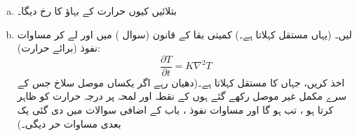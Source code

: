 \begin{enumerate}[a.]
\item
بتلائیں  کیوں حرارت کے بہاؤ کا رخ دیگا۔
\item
{}  لیں۔ (یہاں مستقل  کہلاتا ہے۔) کمیتی بقا کے قانون  (سوال ) میں  اور  لے کر مساوات نفوذ (برائے حرارت):
\[\frac{\partial T}{\partial t}=K\nabla^2 T\]
اخذ کریں، جہاں    کا مستقل کہلاتا ہے۔(دھیان رہے اگر یکساں موصل سلاخ جس کے سرے مکمل غیر موصل رکھے گئے ہوں کے نقطہ   اور لمحہ  پر  درجہ حرارت کو    ظاہر کرتا ہو ، تب  ہو گا اور مساوات نفوذ ، باب  کے  اضافی سوالات میں دی گئی یک بعدی مساوات حر دیگی۔)
\end{enumerate}

